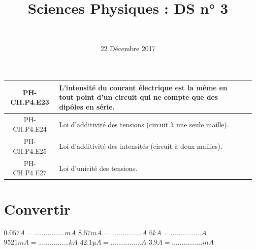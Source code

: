 \documentclass[a4paper,11pt]{exam}
\author{\ }
\date{22 Décembre 2017}
\title{Sciences Physiques : DS n° 3}
\begin{document}
%	

	\maketitle
\vspace*{-0.5cm}	

\begin{scriptsize}
	
\begin{center}
	\begin{tabular}{@{\ }c@{\ }||@{\ }l@{\ }|@{\ $\qquad$}l@{\ }|}
		\hline
		PH-CH.P4.E23 & L’intensité du courant électrique est la même en tout point d’un circuit qui ne compte que des dipôles en série. &  \\
		\hline
		PH-CH.P4.E24 & Loi d’additivité des tensions (circuit à une seule maille). &  \\
		\hline
		PH-CH.P4.E25 & Loi d’additivité des intensités (circuit à deux mailles). &  \\
		\hline
		PH-CH.P4.E27 & Loi d’unicité des tensions. &  \\
		\hline
	\end{tabular}
\end{center}

\end{scriptsize}
%


\section{Convertir}

\begin{questions}
	\begin{multicols}{3}
		
	\question $\num{0.057} A = ................ mA$
	\question $\num{8.57} mA = ................ A$
	\question $\num{6} kA = ................ A$
	\question $\num{9521} mA = ................ kA$
	\question $\num{42.1} µA = ................ A$
	\question $\num{3.9} A = ................ mA$
	
	\end{multicols}
	
\end{questions}



\newpage 



%
\end{document}
